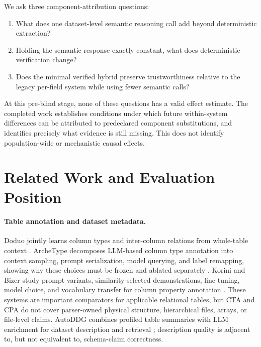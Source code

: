 \documentclass[11pt]{article}
\begin{document}
We ask three component-attribution questions:
\begin{enumerate}[label=\textbf{RQ\arabic*:},leftmargin=2.2cm]
  \item What does one dataset-level semantic reasoning call add beyond deterministic extraction?
  \item Holding the semantic response exactly constant, what does deterministic verification change?
  \item Does the minimal verified hybrid preserve trustworthiness relative to the legacy per-field system while using fewer semantic calls?
\end{enumerate}

At this pre-blind stage, none of these questions has a valid effect estimate. The
completed work establishes conditions under which future within-system differences
can be attributed to predeclared component substitutions, and identifies precisely
what evidence is still missing. This does not identify population-wide or
mechanistic causal effects.

\section{Related Work and Evaluation Position}

\paragraph{Table annotation and dataset metadata.}
Doduo jointly learns column types and inter-column relations from whole-table
context \cite{suhara2022doduo}. ArcheType decomposes LLM-based column type
annotation into context sampling, prompt serialization, model querying, and label
remapping, showing why these choices must be frozen and ablated separately
\cite{feuer2024archetype}. Korini and Bizer study prompt variants,
similarity-selected demonstrations, fine-tuning, model choice, and vocabulary
transfer for column property annotation \cite{korini2025cpa}. These systems are
important comparators for applicable relational tables, but CTA and CPA do not
cover parser-owned physical structure, hierarchical files, arrays, or file-level
claims. AutoDDG combines profiled table summaries with LLM enrichment for dataset
description and retrieval \cite{zhang2026autoddg}; description quality is adjacent
to, but not equivalent to, schema-claim correctness.
\end{document}
